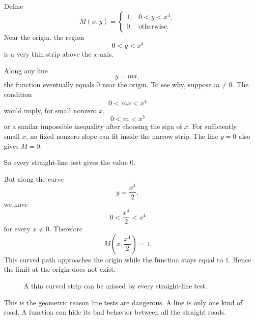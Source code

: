 Define
\[
    M(x,y)=
    \begin{cases}
    1, & 0<y<x^4,\\
    0, & \text{otherwise}.
    \end{cases}
\]
Near the origin, the region
\[
    0<y<x^4
\]
is a very thin strip above the \(x\)-axis.

Along any line
\[
    y=mx,
\]
the function eventually equals \(0\) near the origin.  To see why, suppose \(m\ne0\).
The condition
\[
    0<mx<x^4
\]
would imply, for small nonzero \(x\),
\[
    0<m<x^3
\]
or a similar impossible inequality after choosing the sign of \(x\).  For sufficiently
small \(x\), no fixed nonzero slope can fit inside the narrow strip.  The line \(y=0\)
also gives \(M=0\).

So every straight-line test gives the value \(0\).

But along the curve
\[
    y=\frac{x^4}{2},
\]
we have
\[
    0<\frac{x^4}{2}<x^4
\]
for every \(x\ne0\).  Therefore
\[
    M\left(x,\frac{x^4}{2}\right)=1.
\]
This curved path approaches the origin while the function stays equal to \(1\).  Hence
the limit at the origin does not exist.

\begin{figure}[h]
\centering
{}
\caption{A thin curved strip can be missed by every straight-line test.}
\end{figure}

This is the geometric reason line tests are dangerous.  A line is only one kind of road.
A function can hide its bad behavior between all the straight roads.

